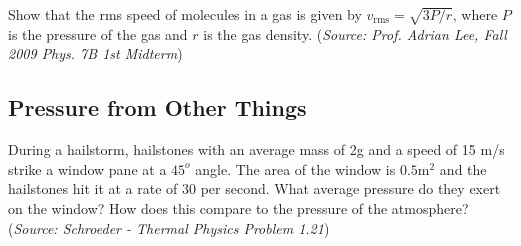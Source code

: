 \documentclass{article}
\begin{document}
Show that the rms speed of molecules in a gas is given by $v_{\mathrm{rms}} = \sqrt{3P/r}$, where $P$ is the pressure of the gas and $r$ is the gas density. (\textit{Source: Prof. Adrian Lee, Fall 2009 Phys. 7B 1st Midterm})

\subsection{Pressure from Other Things}

During a hailstorm, hailstones with an average mass of 2g and a speed of 15 m/s strike a window pane at a $45^{o}$ angle. The area of the window is $0.5 \mathrm{m}^2$ and the hailstones hit it at a rate of 30 per second. What average pressure do they exert on the window? How does this compare to the pressure of the atmosphere? (\textit{Source: Schroeder - Thermal Physics Problem 1.21})
\end{document}
